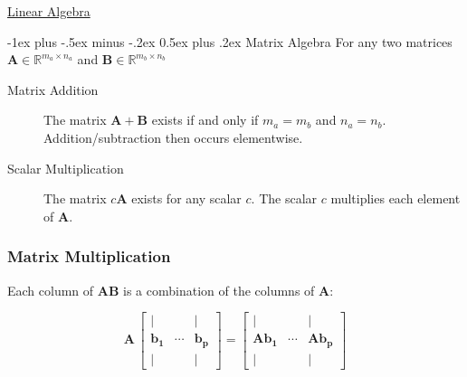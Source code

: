 \documentclass[10pt,landscape,letterpaper]{article}
\makeatletter
\renewcommand{\section}{\@startsection{section}{1}{0mm}%
                                {-1ex plus -.5ex minus -.2ex}%
                                {0.5ex plus .2ex}%
                                {\normalfont\large\bfseries}}
\newcommand{\matr}[1]{\mathbf{#1}}
\newcommand{\bvec}[1]{\mathbf{#1}}
\newcommand{\vecspace}[1]{\mathbb{#1}}
\makeatother
\begin{document}
\begin{multicols}{3}
    
\setlength{\premulticols}{1pt}
\setlength{\postmulticols}{1pt}
\setlength{\multicolsep}{1pt}
\setlength{\columnsep}{2pt}

\begin{center}
    \Large{\underline{Linear Algebra}} \\
\end{center}

\section{Matrix Algebra}
For any two matrices $\matr{A} \in \vecspace{R}^{m_a \times n_a}$ and $\matr{B} \in \vecspace{R}^{m_b \times n_b}$
\begin{description}
    \item[Matrix Addition] The matrix $\matr{A+B}$ exists if and only if $m_a = m_b$ and $n_a = n_b$. Addition/subtraction then occurs elementwise.
    \item[Scalar Multiplication] The matrix $c\matr{A}$ exists for any scalar $c$. The scalar $c$ multiplies each element of $\matr{A}$.
\end{description}
\vspace{-8pt}
\subsubsection{Matrix Multiplication}
Each column of $\matr{AB}$ is a combination of the columns of $\matr{A}$:

\begin{equation*}
\matr{A} \, \begin{bmatrix}
\vert & & \vert \\
\bvec{b_1} & \cdots & \bvec{b_p} \\
\vert & & \vert
\end{bmatrix} = \begin{bmatrix}
\vert & & \vert \\
\matr{A}\bvec{b_1} & \cdots & \matr{A}\bvec{b_p} \\
\vert & & \vert
\end{bmatrix}
\end{equation*}


\end{multicols}
\end{document}
